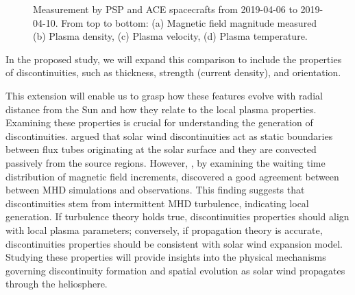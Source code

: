 \documentclass[
  letterpaper,
  DIV=11,
  numbers=noendperiod]{scrartcl}
\begin{document}
\begin{figure}


\caption{\label{fig-alignment}Measurement by PSP and ACE spacecrafts from 2019-04-06 to 2019-04-10. From top to bottom: (a) Magnetic field magnitude measured (b) Plasma density, (c) Plasma velocity, (d) Plasma temperature.}

\end{figure}%

In the proposed study, we will expand this comparison to include the properties of discontinuities, such as thickness, strength (current density), and orientation.

This extension will enable us to grasp how these features evolve with radial distance from the Sun and how they relate to the local plasma properties. Examining these properties is crucial for understanding the generation of discontinuities.
\citet{borovskyFluxTubeTexture2008} argued that solar wind discontinuities act as static boundaries between flux tubes originating at the solar surface and they are convected passively from the source regions. However, \citet{grecoStatisticalAnalysisDiscontinuities2009}, by examining the waiting time distribution of magnetic ﬁeld increments, discovered a good agreement between between MHD simulations and observations. This finding suggests that discontinuities stem from intermittent MHD turbulence, indicating local generation.
If turbulence theory holds true, discontinuities properties should align with local plasma parameters; conversely, if propagation theory is accurate, discontinuities properties should be consistent with solar wind expansion model. Studying these properties will provide insights into the physical mechanisms governing discontinuity formation and spatial evolution as solar wind propagates through the heliosphere.
\end{document}
